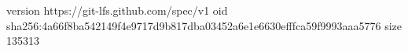version https://git-lfs.github.com/spec/v1
oid sha256:4a66f8ba542149f4e9717d9b817dba03452a6e1e6630efffca59f9993aaa5776
size 135313

